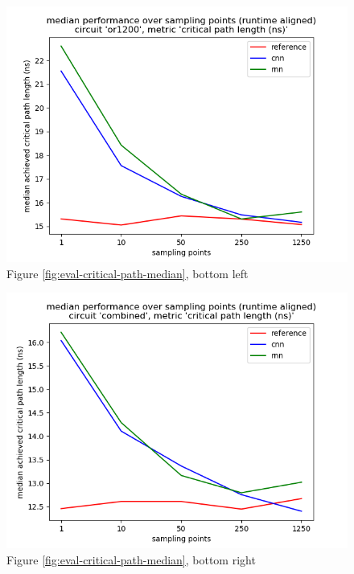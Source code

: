\begin{figure}[H]
	\includegraphics[width=\linewidth]{plots/eval-or1200-critical-path-median-full.png}
	\caption{Figure \ref{fig:eval-critical-path-median}, bottom left}
\end{figure}

\begin{figure}[H]
	\includegraphics[width=\linewidth]{plots/eval-combined-critical-path-median-full.png}
	\caption{Figure \ref{fig:eval-critical-path-median}, bottom right}
\end{figure}

